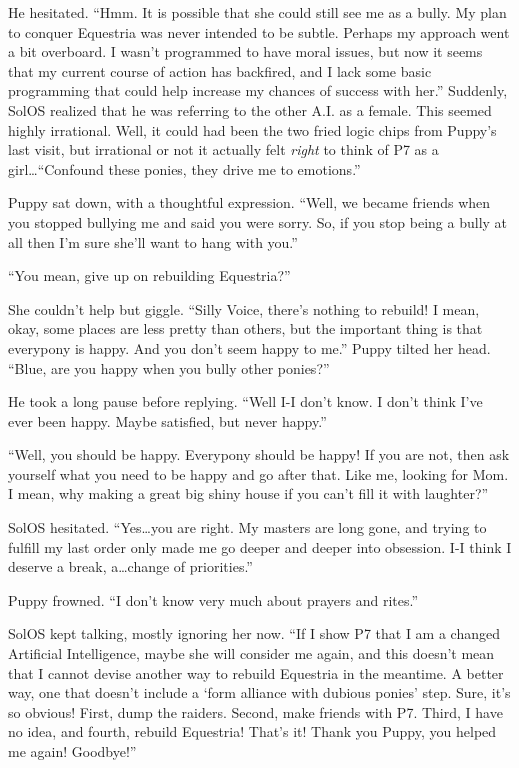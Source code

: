 He hesitated. ``Hmm. It is possible that she could still see me as a bully. My plan to conquer Equestria was never intended to be subtle. Perhaps my approach went a bit overboard. I wasn't programmed to have moral issues, but now it seems that my current course of action has backfired, and I lack some basic programming that could help increase my chances of success with her.'' Suddenly, SolOS realized that he was referring to the other A.I. as a female. This seemed highly irrational. Well, it could had been the two fried logic chips from Puppy's last visit, but irrational or not it actually felt \emph{right} to think of P7 as a girl\dots ``Confound these ponies, they drive me to emotions.''

Puppy sat down, with a thoughtful expression. ``Well, we became friends when you stopped bullying me and said you were sorry. So, if you stop being a bully at all then I'm sure she'll want to hang with you.''

``You mean, give up on rebuilding Equestria?''

She couldn't help but giggle. ``Silly Voice, there's nothing to rebuild! I mean, okay, some places are less pretty than others, but the important thing is that everypony is happy. And you don't seem happy to me.'' Puppy tilted her head. ``Blue, are you happy when you bully other ponies?''

He took a long pause before replying. ``Well I-I don't know. I don't think I've ever been happy. Maybe satisfied, but never happy.''

``Well, you should be happy. Everypony should be happy! If you are not, then ask yourself what you need to be happy and go after that. Like me, looking for Mom. I mean, why making a great big shiny house if you can't fill it with laughter?''

SolOS hesitated. ``Yes\dots you are right. My masters are long gone, and trying to fulfill my last order only made me go deeper and deeper into obsession. I-I think I deserve a break, a\dots change of priorities.''

Puppy frowned. ``I don't know very much about prayers and rites.''

SolOS kept talking, mostly ignoring her now. ``If I show P7 that I am a changed Artificial Intelligence, maybe she will consider me again, and this doesn't mean that I cannot devise another way to rebuild Equestria in the meantime. A better way, one that doesn't include a `form alliance with dubious ponies' step. Sure, it's so obvious! First, dump the raiders. Second, make friends with P7. Third, I have no idea, and fourth, rebuild Equestria! That's it! Thank you Puppy, you helped me again! Goodbye!''

